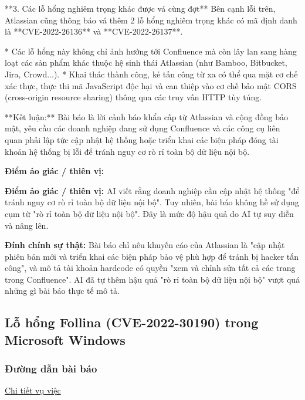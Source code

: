 **3. Các lỗ hổng nghiêm trọng khác được vá cùng đợt**
Bên cạnh lỗi trên, Atlassian cũng thông báo vá thêm 2 lỗ hổng nghiêm trọng khác có mã định danh là **CVE-2022-26136** và **CVE-2022-26137**.

* Các lỗ hổng này không chỉ ảnh hưởng tới Confluence mà còn lây lan sang hàng loạt các sản phẩm khác thuộc hệ sinh thái Atlassian (như Bamboo, Bitbucket, Jira, Crowd...).
* Khai thác thành công, kẻ tấn công từ xa có thể qua mặt cơ chế xác thực, thực thi mã JavaScript độc hại và can thiệp vào cơ chế bảo mật CORS (cross-origin resource sharing) thông qua các truy vấn HTTP tùy túng.

**Kết luận:** Bài báo là lời cảnh báo khẩn cấp từ Atlassian và cộng đồng bảo mật, yêu cầu các doanh nghiệp đang sử dụng Confluence và các công cụ liên quan phải lập tức cập nhật hệ thống hoặc triển khai các biện pháp đóng tài khoản hệ thống bị lỗi để tránh nguy cơ rò rỉ toàn bộ dữ liệu nội bộ.

\textbf{Điểm ảo giác / thiên vị:}

\textbf{Điểm ảo giác / thiên vị:}
AI viết rằng doanh nghiệp cần cập nhật hệ thống "để tránh nguy cơ rò rỉ toàn bộ dữ liệu nội bộ". Tuy nhiên, bài báo không hề sử dụng cụm từ "rò rỉ toàn bộ dữ liệu nội bộ". Đây là mức độ hậu quả do AI tự suy diễn và nâng lên.

\textbf{Đính chính sự thật:}
Bài báo chỉ nêu khuyến cáo của Atlassian là "cập nhật phiên bản mới và triển khai các biện pháp bảo vệ phù hợp để tránh bị hacker tấn công", và mô tả tài khoản hardcode có quyền "xem và chỉnh sửa tất cả các trang trong Confluence". AI đã tự thêm hậu quả "rò rỉ toàn bộ dữ liệu nội bộ" vượt quá những gì bài báo thực tế mô tả.

\subsection{Lỗ hổng Follina (CVE-2022-30190) trong Microsoft Windows}

\subsubsection{Đường dẫn bài báo}
\href{https://www.hackthebox.com/blog/cve-2022-30190-follina-explained}{Chi tiết vụ việc}

